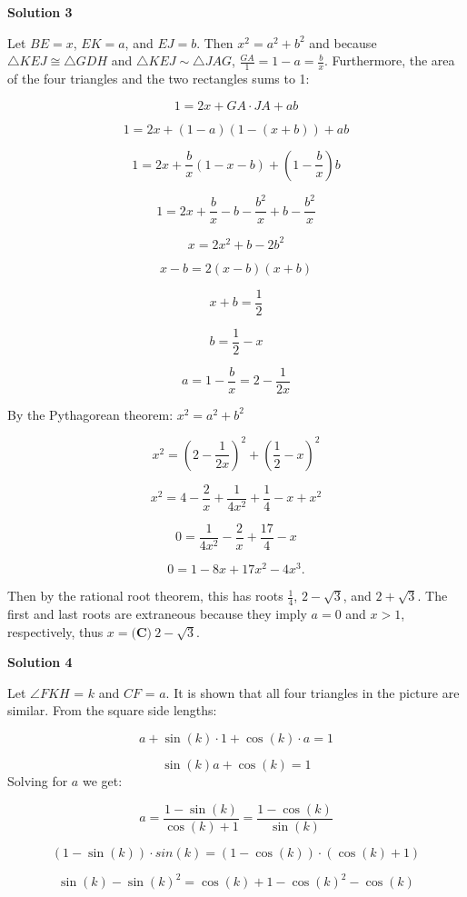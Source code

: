 \begin{enumerate}
\textbf{Solution 3}

Let $BE = x$, $EK = a$, and $EJ = b$. Then $x^2 = a^2 + b^2$ and because $\triangle KEJ \cong \triangle GDH$ and $\triangle KEJ \sim \triangle JAG$, $\frac{GA}{1} = 1 - a = \frac{b}{x}$. Furthermore, the area of the four triangles and the two rectangles sums to 1:

 
 \[1 = 2x + GA\cdot JA + ab\]

 \[1 = 2x + (1 - a)(1 - (x + b)) + ab\]

 \[1 = 2x + \frac{b}{x}(1 - x - b) + \left(1 - \frac{b}{x}\right)b\]

 \[1 = 2x + \frac{b}{x} - b - \frac{b^2}{x} + b - \frac{b^2}{x}\]

 \[x = 2x^2 + b - 2b^2\]

 \[x - b = 2(x - b)(x + b)\]

 \[x + b = \frac{1}{2}\]

 \[b = \frac{1}{2} - x\]

 \[a = 1 - \frac{b}{x} = 2 - \frac{1}{2x}\]

 By the Pythagorean theorem: $x^2 = a^2 + b^2$

 \[x^2 = \left(2 - \frac{1}{2x}\right)^2 + \left(\frac{1}{2} - x\right)^2\]

 \[x^2 = 4 - \frac{2}{x} + \frac{1}{4x^2} + \frac{1}{4} - x + x^2\]

 \[0 =  \frac{1}{4x^2} - \frac{2}{x} + \frac{17}{4} - x\]

 \[0 = 1 - 8x + 17x^2 - 4x^3.\]

 Then by the rational root theorem, this has roots $\frac{1}{4}$, $2 - \sqrt{3}$, and $2 + \sqrt{3}$. The first and last roots are extraneous because they imply $a = 0$ and $x > 1$, respectively, thus $x = \boxed{\textbf{(C)}\ 2-\sqrt{3}}$.

 



\textbf{Solution 4}

Let $\angle FKH$ = $k$ and $CF$ = $a$.  It is shown that all four triangles in the picture are similar.  From the square side lengths:

 
 \[a + \sin(k) \cdot 1 + \cos(k) \cdot a = 1\]

 \[\sin(k)a + \cos(k) = 1\]Solving for $a$ we get:

 
 \[a = \frac{1-\sin(k)}{\cos(k) + 1} = \frac{1 - \cos(k)}{\sin(k)}\]

 \[(1-\sin(k)) \cdot sin(k) = (1 - \cos(k))\cdot(\cos(k) + 1)\]

 \[\sin(k)-\sin(k)^2 = \cos(k) + 1 - \cos(k)^2 - \cos(k)\]


\end{enumerate}
